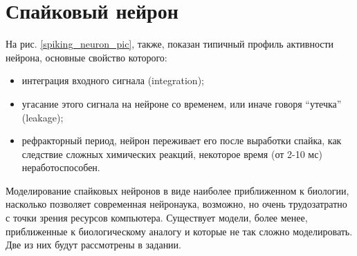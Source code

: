 \documentclass[a4paper,10pt,usenames]{article}
\begin{document}
\section{Спайковый нейрон}
\indent На рис. \ref{spiking_neuron_pic}, также, показан типичный профиль активности нейрона, основные свойство которого: 
\begin{itemize}
\item интеграция входного сигнала (integration);
\item угасание этого сигнала на нейроне со временем, или иначе говоря ``утечка'' (leakage);
\item рефракторный период, нейрон переживает его после выработки спайка, как следствие сложных химических реакций, некоторое время (от 2-10 мс) неработоспособен.
\end{itemize}
\indent Моделирование спайковых нейронов в виде наиболее приближенном к биологии, насколько позволяет современная нейронаука, возможно, но очень трудозатратно с точки зрения ресурсов компьютера. Существует модели, более менее, приближенные к биологическому аналогу и которые не так сложно моделировать. Две из них будут рассмотрены в задании.
\end{document}
